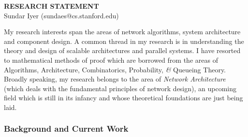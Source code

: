 \documentclass[a4paper, 10pt]{article}
\begin{document}
\thispagestyle{fancy}
\lhead{}
\rhead{}
\renewcommand{\headrulewidth}{0pt} 
\renewcommand{\footrulewidth}{0pt} 
\fancyfoot[C]{\footnotesize \textcolor{gray}{http://www.stanford.edu/$\sim$sundaes/application}} 


\pagestyle{fancy}
\lhead{\textcolor{gray}{\it Sundar Iyer}}
\rhead{\textcolor{gray}{\thepage/\totalpages{}}}

\begin{small}

\begin{center}
{\LARGE \bf RESEARCH STATEMENT}\\
\vspace*{0.1cm}
{\normalsize Sundar Iyer (sundaes@cs.stanford.edu)}
\end{center}



My research interests span the areas of network algorithms, system
architecture and component design. A common thread in my research is in understanding the
theory and design of scalable architectures and parallel systems.
I have resorted to mathematical methods 
of proof which are borrowed from the areas of Algorithms, 
Architecture, Combinatorics, Probability, {\it \&} Queueing Theory.
Broadly speaking, my research belongs to
the area of {\it Network Architecture} (which deals with the fundamental 
principles of network design), 
an upcoming field which is still in its infancy and whose theoretical foundations are just being laid.


\subsubsection*{Background and Current Work}


\end{small}
\end{document}
